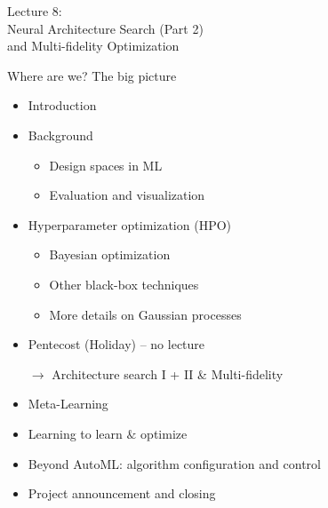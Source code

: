 \begin{frame}[c]{}

\centering
\huge
Lecture 8:\\
Neural Architecture Search (Part 2) \\
	and Multi-fidelity Optimization\\
\end{frame}
\begin{frame}[c]{Where are we? The big picture}

\begin{itemize}
	\item Introduction
	\item Background
	\begin{itemize}
		\item Design spaces in ML
		\item Evaluation and visualization
	\end{itemize}
	\item Hyperparameter optimization (HPO)
	\begin{itemize}
		\item Bayesian optimization
		\item Other black-box techniques
		\item More details on Gaussian processes
	\end{itemize}
	\item Pentecost (Holiday) -- no lecture
	\item[$\to$]  Architecture search I + II \& Multi-fidelity
	\item Meta-Learning
	\item Learning to learn $\&$ optimize
	\item Beyond AutoML: algorithm configuration and control
	\item Project announcement and closing
\end{itemize}

\end{frame}




